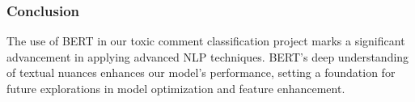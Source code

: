 \subsubsection{Conclusion}
The use of BERT in our toxic comment classification project marks a significant advancement in applying advanced NLP techniques. BERT’s deep understanding of textual nuances enhances our model’s performance, setting a foundation for future explorations in model optimization and feature enhancement.